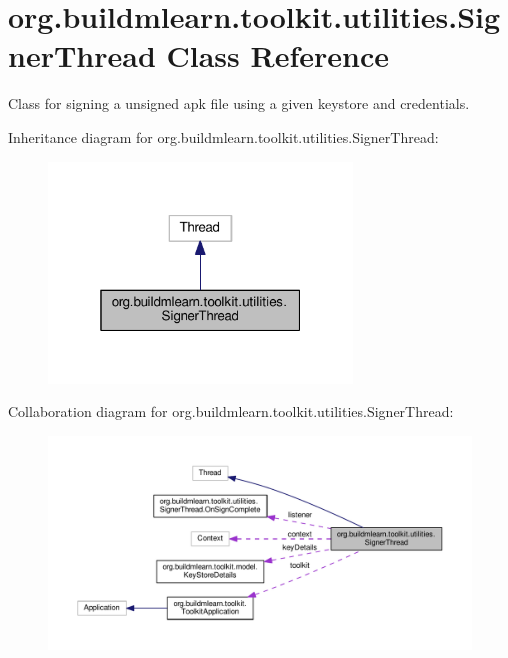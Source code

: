 \hypertarget{classorg_1_1buildmlearn_1_1toolkit_1_1utilities_1_1SignerThread}{}\section{org.\+buildmlearn.\+toolkit.\+utilities.\+Signer\+Thread Class Reference}
\label{classorg_1_1buildmlearn_1_1toolkit_1_1utilities_1_1SignerThread}


Class for signing a unsigned apk file using a given keystore and credentials.  




Inheritance diagram for org.\+buildmlearn.\+toolkit.\+utilities.\+Signer\+Thread\+:
\nopagebreak
\begin{figure}[H]
\begin{center}
\leavevmode
\includegraphics[width=229pt]{classorg_1_1buildmlearn_1_1toolkit_1_1utilities_1_1SignerThread__inherit__graph}
\end{center}
\end{figure}


Collaboration diagram for org.\+buildmlearn.\+toolkit.\+utilities.\+Signer\+Thread\+:
\nopagebreak
\begin{figure}[H]
\begin{center}
\leavevmode
\includegraphics[width=350pt]{classorg_1_1buildmlearn_1_1toolkit_1_1utilities_1_1SignerThread__coll__graph}
\end{center}
\end{figure}
